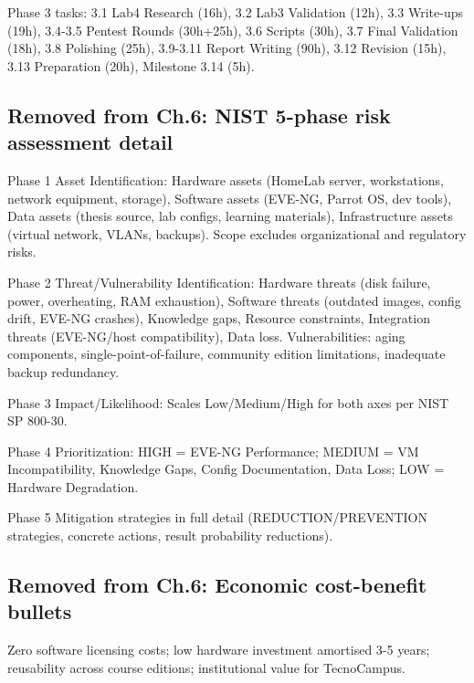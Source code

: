 \documentclass[a4paper,11pt]{article}
\begin{document}
Phase 3 tasks: 3.1 Lab4 Research (16h), 3.2 Lab3 Validation (12h),
3.3 Write-ups (19h), 3.4-3.5 Pentest Rounds (30h+25h), 3.6 Scripts (30h),
3.7 Final Validation (18h), 3.8 Polishing (25h), 3.9-3.11 Report Writing (90h),
3.12 Revision (15h), 3.13 Preparation (20h), Milestone 3.14 (5h).

\subsection{Removed from Ch.6: NIST 5-phase risk assessment detail}


Phase 1 Asset Identification: Hardware assets (HomeLab server, workstations,
network equipment, storage), Software assets (EVE-NG, Parrot OS, dev tools),
Data assets (thesis source, lab configs, learning materials), Infrastructure assets
(virtual network, VLANs, backups). Scope excludes organizational and regulatory risks.

Phase 2 Threat/Vulnerability Identification: Hardware threats (disk failure, power,
overheating, RAM exhaustion), Software threats (outdated images, config drift, EVE-NG
crashes), Knowledge gaps, Resource constraints, Integration threats (EVE-NG/host
compatibility), Data loss. Vulnerabilities: aging components, single-point-of-failure,
community edition limitations, inadequate backup redundancy.

Phase 3 Impact/Likelihood: Scales Low/Medium/High for both axes per NIST SP 800-30.

Phase 4 Prioritization: HIGH = EVE-NG Performance; MEDIUM = VM Incompatibility,
Knowledge Gaps, Config Documentation, Data Loss; LOW = Hardware Degradation.

Phase 5 Mitigation strategies in full detail (REDUCTION/PREVENTION strategies,
concrete actions, result probability reductions).

\subsection{Removed from Ch.6: Economic cost-benefit bullets}


Zero software licensing costs; low hardware investment amortised 3-5 years;
reusability across course editions; institutional value for TecnoCampus.
\end{document}
